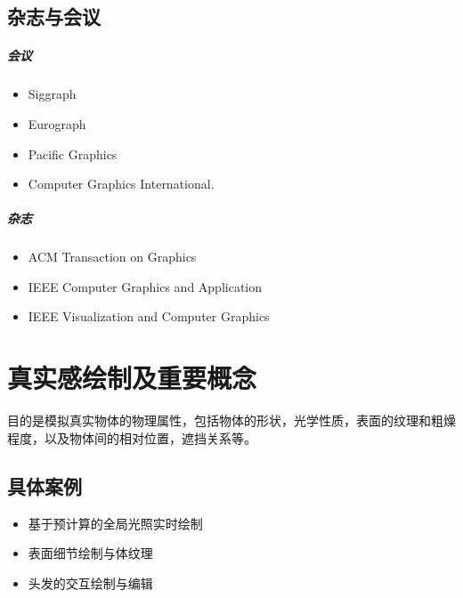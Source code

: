 \documentclass[UTF8,a4paper,12pt]{ctexbook}
\begin{document}
	\section{杂志与会议}
		\paragraph{会议}
		\begin{itemize}
			\item Siggraph 
			\item Eurograph
			\item Pacific Graphics
			\item Computer Graphics International.
		\end{itemize}
		
		\paragraph{杂志}
			\begin{itemize}
				\item ACM Transaction on Graphics
				\item IEEE Computer Graphics and Application
				\item IEEE Visualization and Computer Graphics
			\end{itemize}




\chapter{真实感绘制及重要概念}
	目的是模拟真实物体的物理属性，包括物体的形状，光学性质，表面的纹理和粗燥程度，以及物体间的相对位置，遮挡关系等。
	

	\section{具体案例}
		\begin{itemize}
			\item 基于预计算的全局光照实时绘制
			\item 表面细节绘制与体纹理
			\item 头发的交互绘制与编辑
		\end{itemize}
	
\end{document}
